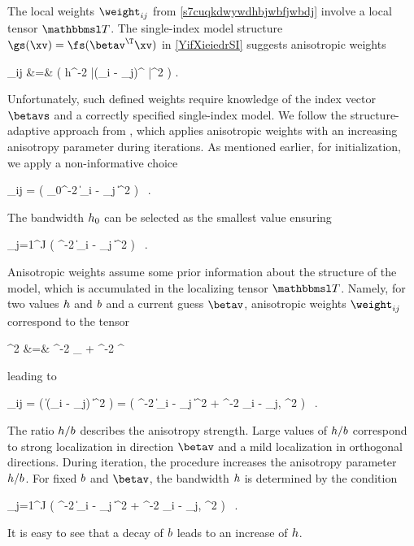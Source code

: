 The local weights \( \weight_{ij} \) from \eqref{s7cuqkdwywdhbjwbfjwbdj} involve a local tensor \( \TEDR \).
The single-index model structure \( \gs(\xv) = \fs(\betav^{\T} \xv) \) in \eqref{YifXieiedrSI} suggests
anisotropic weights
\begin{EQA}
	\weight_{ij}
	&=&
	\Kern\bigl( h^{-2} |(\Xv_{i} - \xv_{j})^{\T} \betavs|^{2} \bigr) .
\label{s7cuqkdwywdhbjwbfjwbdji}
\end{EQA}
Unfortunately, such defined weights require knowledge of the index vector \( \betavs \) and 
a correctly specified single-index model. 
We follow the structure-adaptive approach from \cite{HJPS}, which applies anisotropic weights 
with an increasing anisotropy parameter during iterations.
As mentioned earlier, for initialization, we apply a non-informative choice 
\begin{EQA}[c]
	\weight_{ij} = \Kern\bigl( \hiso_{0}^{-2} \| \Xv_{i} - \xv_{j} \|^{2} \bigr) 
	\, .
\end{EQA}
The bandwidth \( h_{0} \) can be selected as the smallest value ensuring
\begin{EQA}[c]
	\sum_{j=1}^{J} \sumi \Kern\bigl( \hiso^{-2} \| \Xv_{i} - \xv_{j} \|^{2} \bigr)
	\geq 
	\nmin
	\, .
\label{jhgiverkytde4w34etycj}
\end{EQA}
%
Anisotropic weights assume some prior information about the structure of the model, which is accumulated 
in the localizing tensor \( \TEDR \).
Namely, for two values \( h \) and \( b \) and a current guess \( \betav \), anisotropic weights \( \weight_{ij} \)
correspond to the tensor 
\begin{EQA}[rcl]
	\TEDR^{2}
	&=&
	\hiso^{-2} \Id_{\dimd} + \haniso^{-2} \betav \betav^{\T}
\label{iufhvu8kjbmnll475edf}
\end{EQA}
leading to 
\begin{EQA}[c]
	\weight_{ij}
	=
	\Kern\bigl( \| \TEDR (\Xv_{i} - \xv_{j}) \|^{2} \bigr)
	=
	\Kern\bigl( \hiso^{-2} \| \Xv_{i} - \xv_{j} \|^{2} + \haniso^{-2} \langle \Xv_{i} - \xv_{j}, \betav \rangle^{2} \bigr)
	\, .
\end{EQA}
The ratio \( h/b \) describes the anisotropy strength.
Large values of \( h/b \) correspond to strong localization in direction \( \betav \)
and a mild localization in orthogonal directions. 
During iteration, the procedure increases the anisotropy parameter \( h/b \).
For fixed \( b \) and \( \betav \), the bandwidth \( h \) is determined by the condition
\begin{EQA}[c]
	 \sum_{j=1}^{J} \sumi 
		\Kern\bigl( \hiso^{-2} \| \Xv_{i} - \xv_{j} \|^{2} + \haniso^{-2} \langle \Xv_{i} - \xv_{j}, \betav \rangle^{2} \bigr)
	\geq 
	\nmin
	\, .
\label{jhgiverkytde4w34etycja}
\end{EQA}
It is easy to see that a decay of \( b \) leads to an increase of \( h \).


